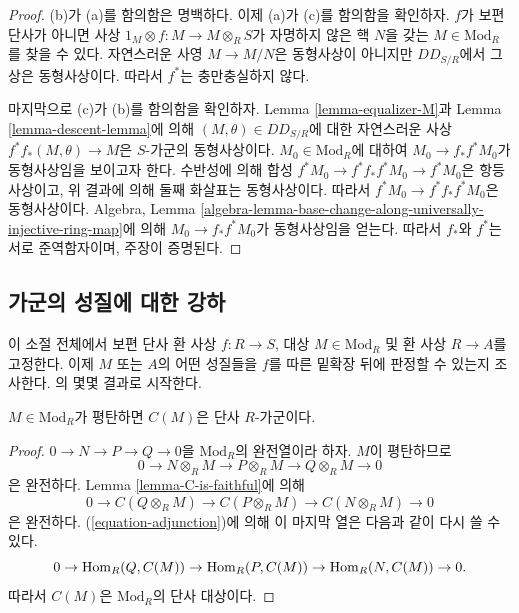 \begin{proof}
(b)가 (a)를 함의함은 명백하다. 이제 (a)가 (c)를 함의함을 확인하자.
$f$가 보편 단사가 아니면 사상
$1_M \otimes f: M \to M \otimes_R S$가 자명하지 않은 핵 $N$을 갖는
$M \in \text{Mod}_R$를 찾을 수 있다. 자연스러운 사영 $M \to M/N$은
동형사상이 아니지만 $DD_{S/R}$에서 그 상은 동형사상이다. 따라서
$f^*$는 충만충실하지 않다.

\medskip\noindent
마지막으로 (c)가 (b)를 함의함을 확인하자. Lemma
\ref{lemma-equalizer-M}과 Lemma \ref{lemma-descent-lemma}에 의해
$(M, \theta) \in DD_{S/R}$에 대한 자연스러운 사상
$f^* f_*(M,\theta) \to M$은 $S$-가군의 동형사상이다.
$M_0 \in \text{Mod}_R$에 대하여 $M_0 \to f_*f^*M_0$가 동형사상임을
보이고자 한다. 수반성에 의해 합성
$f^*M_0 \to f^*f_*f^*M_0 \to f^*M_0$은 항등사상이고, 위 결과에 의해
둘째 화살표는 동형사상이다. 따라서
$f^*M_0 \to f^*f_*f^*M_0$은 동형사상이다. Algebra, Lemma
\ref{algebra-lemma-base-change-along-universally-injective-ring-map}에 의해
$M_0 \to f_* f^* M_0$가 동형사상임을 얻는다. 따라서 $f_*$와 $f^*$는
서로 준역함자이며, 주장이 증명된다.
\end{proof}

\subsection{가군의 성질에 대한 강하}
\label{subsection-descent-properties-modules}

\noindent
이 소절 전체에서 보편 단사 환 사상 $f : R \to S$, 대상
$M \in \text{Mod}_R$ 및 환 사상 $R \to A$를 고정한다. 이제 $M$ 또는
$A$의 어떤 성질들을 $f$를 따른 밑확장 뒤에 판정할 수 있는지 조사한다.
\cite{mesablishvili2}의 몇몇 결과로 시작한다.

\begin{lemma}
\label{lemma-flat-to-injective}
$M \in \text{Mod}_R$가 평탄하면 $C(M)$은 단사 $R$-가군이다.
\end{lemma}

\begin{proof}
$0 \to N \to P \to Q \to 0$을 $\text{Mod}_R$의 완전열이라 하자.
$M$이 평탄하므로
$$
0 \to N \otimes_R M \to P \otimes_R M \to Q \otimes_R M \to 0
$$
은 완전하다.
Lemma \ref{lemma-C-is-faithful}에 의해
$$
0 \to C(Q \otimes_R M) \to C(P \otimes_R M) \to C(N \otimes_R M) \to 0
$$
은 완전하다. (\ref{equation-adjunction})에 의해 이 마지막 열은 다음과
같이 다시 쓸 수 있다.
$$
0 \to \mathop{\mathrm{Hom}}\nolimits_R(Q, C(M)) \to \mathop{\mathrm{Hom}}\nolimits_R(P, C(M)) \to \mathop{\mathrm{Hom}}\nolimits_R(N, C(M)) \to 0.
$$
따라서 $C(M)$은 $\text{Mod}_R$의 단사 대상이다.
\end{proof}

